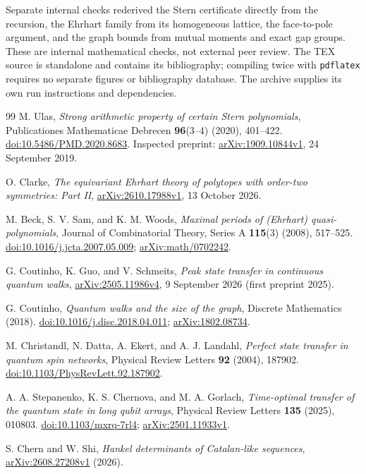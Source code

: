 \documentclass[11pt,a4paper]{article}
\theoremstyle{definition}\newtheorem{definition}[lemma]{Definition}
\theoremstyle{remark}\newtheorem{remark}[lemma]{Remark}
\begin{document}
Separate internal checks rederived the Stern certificate directly from the
recursion, the Ehrhart family from its homogeneous lattice, the face-to-pole
argument, and the graph bounds from mutual moments and exact gap groups.
These are internal mathematical checks, not external peer review.
The TEX source is standalone and contains its bibliography; compiling
twice with \texttt{pdflatex} requires no separate figures or bibliography
database. The archive supplies its own run instructions and dependencies.


\begin{thebibliography}{99}
M. Ulas, \emph{Strong arithmetic property of certain Stern polynomials},
Publicationes Mathematicae Debrecen \textbf{96}(3--4) (2020), 401--422.
\href{https://doi.org/10.5486/PMD.2020.8683}{doi:10.5486/PMD.2020.8683}.
Inspected preprint: \href{https://arxiv.org/abs/1909.10844v1}{arXiv:1909.10844v1},
24 September 2019.

O. Clarke, \emph{The equivariant Ehrhart theory of polytopes with order-two
symmetries: Part II},
\href{https://arxiv.org/abs/2610.17988v1}{arXiv:2610.17988v1},
13 October 2026.

M. Beck, S. V. Sam, and K. M. Woods,
\emph{Maximal periods of (Ehrhart) quasi-polynomials},
Journal of Combinatorial Theory, Series A \textbf{115}(3) (2008), 517--525.
\href{https://doi.org/10.1016/j.jcta.2007.05.009}{doi:10.1016/j.jcta.2007.05.009};
\href{https://arxiv.org/abs/math/0702242}{arXiv:math/0702242}.

G. Coutinho, K. Guo, and V. Schmeits,
\emph{Peak state transfer in continuous quantum walks},
\href{https://arxiv.org/abs/2505.11986v4}{arXiv:2505.11986v4},
9 September 2026 (first preprint 2025).

G. Coutinho, \emph{Quantum walks and the size of the graph},
Discrete Mathematics (2018).
\href{https://doi.org/10.1016/j.disc.2018.04.011}{doi:10.1016/j.disc.2018.04.011};
\href{https://arxiv.org/abs/1802.08734}{arXiv:1802.08734}.

M. Christandl, N. Datta, A. Ekert, and A. J. Landahl,
\emph{Perfect state transfer in quantum spin networks},
Physical Review Letters \textbf{92} (2004), 187902.
\href{https://doi.org/10.1103/PhysRevLett.92.187902}{doi:10.1103/PhysRevLett.92.187902}.

A. A. Stepanenko, K. S. Chernova, and M. A. Gorlach,
\emph{Time-optimal transfer of the quantum state in long qubit arrays},
Physical Review Letters \textbf{135} (2025), 010803.
\href{https://doi.org/10.1103/mxrq-7rl4}{doi:10.1103/mxrq-7rl4};
\href{https://arxiv.org/abs/2501.11933v1}{arXiv:2501.11933v1}.

S. Chern and W. Shi,
\emph{Hankel determinants of Catalan-like sequences},
\href{https://arxiv.org/abs/2608.27208v1}{arXiv:2608.27208v1} (2026).
\end{thebibliography}
\end{document}
